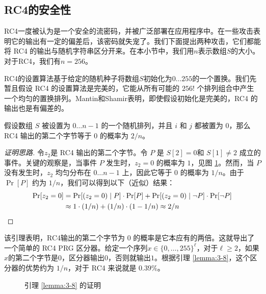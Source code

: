 \subsection{RC4的安全性}


RC4一度被认为是一个安全的流密码，并被广泛部署在应用程序中。在一些攻击表明它的输出有一定的偏差后，该密码就失宠了。我们下面提出两种攻击，它们都能将 RC4 的输出与随机字符串区分开来。在本小节中，我们用$n$表示数组$S$的大小。对于RC4，我们有$n=256$。

\begin{snote}[初始 RC4 输出中的偏差。]
RC4的设置算法基于给定的随机种子将数组$S$初始化为$0 \dots 255$的一个置换。我们先暂且假设 RC4 的设置算法是完美的，它能从所有可能的 $256!$ 个排列组合中产生一个均匀的置换排列。Mantin和Shamir表明，即使假设初始化是完美的，RC4 的输出也是有偏差的。
\end{snote}

\begin{lemma}\label{lemma:3-8}
假设数组 $S$ 被设置为 $0\dots n-1$ 的一个随机排列，并且 $i$ 和 $j$ 都被置为 $0$，那么 RC4 输出的第二个字节等于 $0$ 的概率为 $2/n$。
\end{lemma}

\begin{proof}[证明思路]
令$z_2$是 RC4 输出的第二个字节。令 $P$ 是 $S[2]=0$和 $S[1]\neq2$ 成立的事件。关键的观察是，当事件 $P$ 发生时，$z_2=0$ 的概率为 $1$，见图 \ref{fig:3-13}。然而，当 $P$ 没有发生时，$z_2$ 均匀分布在 $0\dots n-1$ 上，因此它等于 $0$ 的概率为 $1/n$。由于 $\Pr[P]$ 约为 $1/n$，我们可以得到以下（近似）结果：
\[
\begin{aligned}
\Pr[z_2=0] & =\Pr[(z_2=0)\;|\;P]\cdot\Pr[P]+\Pr[(z_2=0)\;|\;\neg P]\cdot\Pr[\neg P]\\
& \approx 1\cdot(1/n)+(1/n)\cdot(1-1/n)\approx2/n \qedhere
\end{aligned}
\]
\end{proof}

该引理表明，RC4输出的第二个字节为 $0$ 的概率是它本应有的两倍。这就导出了一个简单的 RC4 PRG 区分器。给定一个序列$x\in\{0,\dots,255\}^\ell$，对于$\ell\geq2$，如果$x$的第二个字节是$0$，区分器输出$0$，否则就输出$1$。根据引理 \ref{lemma:3-8}，这个区分器的优势约为 $1/n$，对于 RC4 来说就是 $0.39\%$。

\begin{figure}
	\centering
	
	\caption{引理 \ref{lemma:3-8} 的证明}
	\label{fig:3-13}
\end{figure}

